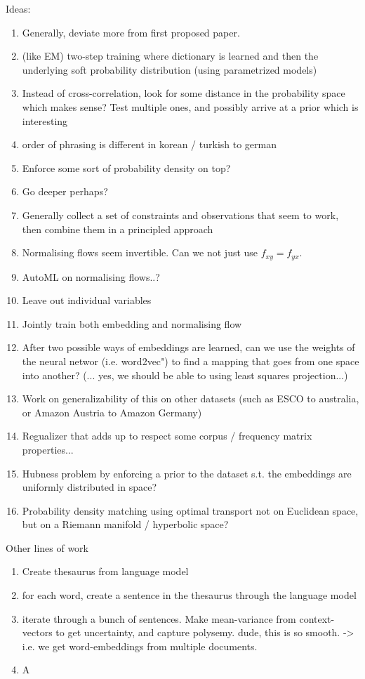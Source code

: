 \documentclass[a4paper,12pt,twoside,openright]{report}
\begin{document}
Ideas:

\begin{enumerate}
\item Generally, deviate more from first proposed paper.
\item (like EM) two-step training where dictionary is learned and then the underlying soft probability distribution (using parametrized models)
\item Instead of cross-correlation, look for some distance in the probability space which makes sense? Test multiple ones, and possibly arrive at a prior which is interesting
\item order of phrasing is different in korean / turkish to german
\item Enforce some sort of probability density on top?
\item Go deeper perhaps?
\item Generally collect a set of constraints and observations that seem to work, then combine them in a principled approach
\item Normalising flows seem invertible. Can we not just use $f_{xy} = f_{yx}$.
\item AutoML on normalising flows..?
\item Leave out individual variables
\item Jointly train both embedding and normalising flow
\item After two possible ways of embeddings are learned, can we use the weights of the neural networ (i.e. word2vec") to find a mapping that goes from one space into another? (... yes, we should be able to using least squares projection...)
\item Work on generalizability of this on other datasets (such as ESCO to australia, or Amazon Austria to Amazon Germany)
\item Regualizer that adds up to respect some corpus / frequency matrix properties...
\item Hubness problem by enforcing a prior to the dataset s.t. the embeddings are uniformly distributed in space?
\item Probability density matching using optimal transport not on Euclidean space, but on a Riemann manifold / hyperbolic space?
\end{enumerate}

Other lines of work

\begin{enumerate}
\item Create thesaurus from language model
\item for each word, create a sentence in the thesaurus through the language model
\item iterate through a bunch of sentences. Make mean-variance from context-vectors to get uncertainty, and capture polysemy. dude, this is so smooth. -> i.e. we get word-embeddings from multiple documents.
\item A
\end{enumerate}
\end{document}

